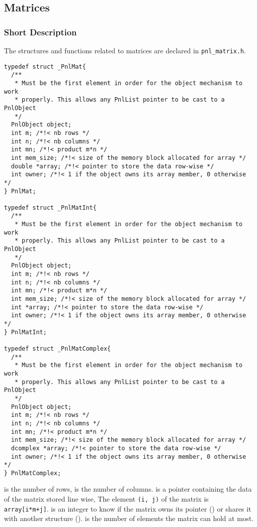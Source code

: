 
\subsection{Matrices}
\subsubsection{Short Description}

The structures and functions related to matrices are declared in
\verb!pnl_matrix.h!.

\begin{verbatim}
typedef struct _PnlMat{
  /**
   * Must be the first element in order for the object mechanism to work
   * properly. This allows any PnlList pointer to be cast to a PnlObject
   */
  PnlObject object; 
  int m; /*!< nb rows */ 
  int n; /*!< nb columns */ 
  int mn; /*!< product m*n */
  int mem_size; /*!< size of the memory block allocated for array */
  double *array; /*!< pointer to store the data row-wise */
  int owner; /*!< 1 if the object owns its array member, 0 otherwise */
} PnlMat;

typedef struct _PnlMatInt{
  /**
   * Must be the first element in order for the object mechanism to work
   * properly. This allows any PnlList pointer to be cast to a PnlObject
   */
  PnlObject object; 
  int m; /*!< nb rows */ 
  int n; /*!< nb columns */ 
  int mn; /*!< product m*n */
  int mem_size; /*!< size of the memory block allocated for array */
  int *array; /*!< pointer to store the data row-wise */
  int owner; /*!< 1 if the object owns its array member, 0 otherwise */
} PnlMatInt;

typedef struct _PnlMatComplex{
  /**
   * Must be the first element in order for the object mechanism to work
   * properly. This allows any PnlList pointer to be cast to a PnlObject
   */
  PnlObject object; 
  int m; /*!< nb rows */ 
  int n; /*!< nb columns */ 
  int mn; /*!< product m*n */
  int mem_size; /*!< size of the memory block allocated for array */
  dcomplex *array; /*!< pointer to store the data row-wise */
  int owner; /*!< 1 if the object owns its array member, 0 otherwise */
} PnlMatComplex;
\end{verbatim}
 is the number of rows,  is the number of columns. 
is a pointer containing the data of the matrix stored line wise, The element
\verb!(i, j)! of the matrix is \verb!array[i*m+j]!.  is an integer to
know if the matrix owns its  pointer () or shares it
with another structure ().  is the number of
elements the matrix can hold at most.

